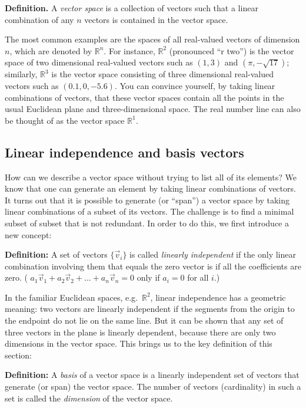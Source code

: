 \documentclass[
  letterpaper,
  DIV=11,
  numbers=noendperiod]{scrreprt}
\begin{document}
\textbf{Definition.} A \emph{vector space} is a collection of vectors
such that a linear combination of any \(n\) vectors is contained in the
vector space.

The most common examples are the spaces of all real-valued vectors of
dimension \(n\), which are denoted by \(\mathbb{R}^n\). For instance,
\(\mathbb{R}^2\) (pronounced ``r two'') is the vector space of two
dimensional real-valued vectors such as \((1,3)\) and
\((\pi, -\sqrt{17})\); similarly, \(\mathbb{R}^3\) is the vector space
consisting of three dimensional real-valued vectors such as
\((0.1,0,-5.6)\). You can convince yourself, by taking linear
combinations of vectors, that these vector spaces contain all the points
in the usual Euclidean plane and three-dimensional space. The real
number line can also be thought of as the vector space \(\mathbb{R}^1\).

\hypertarget{linear-independence-and-basis-vectors}{%
\subsection{Linear independence and basis
vectors}\label{linear-independence-and-basis-vectors}}

How can we describe a vector space without trying to list all of its
elements? We know that one can generate an element by taking linear
combinations of vectors. It turns out that it is possible to generate
(or ``span'') a vector space by taking linear combinations of a subset
of its vectors. The challenge is to find a minimal subset of subset that
is not redundant. In order to do this, we first introduce a new concept:

\textbf{Definition:} A set of vectors \(\{ \vec v_i \}\) is called
\emph{linearly independent} if the only linear combination involving
them that equals the zero vector is if all the coefficients are zero. (
\(a_1 \vec v_1 + a_2 \vec v_2 + ... + a_n \vec v_n = 0\) only if
\(a_i = 0\) for all \(i\).)

In the familiar Euclidean spaces, e.g.~\(\mathbb{R}^2\), linear
independence has a geometric meaning: two vectors are linearly
independent if the segments from the origin to the endpoint do not lie
on the same line. But it can be shown that any set of three vectors in
the plane is linearly dependent, because there are only two dimensions
in the vector space. This brings us to the key definition of this
section:

\textbf{Definition:} A \emph{basis} of a vector space is a linearly
independent set of vectors that generate (or span) the vector space. The
number of vectors (cardinality) in such a set is called the
\emph{dimension} of the vector space.
\end{document}
